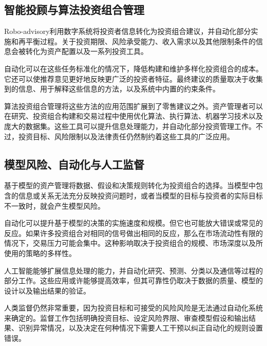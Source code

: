 \subsection{智能投顾与算法投资组合管理}

Robo-advisory利用数字系统将投资者信息转化为投资组合建议，并自动化部分实施和再平衡过程。关于投资期限、风险承受能力、收入需求以及其他限制条件的信息会被转化为资产配置以及一系列投资工具。

自动化可以在这些任务标准化的情况下，降低构建和维护多样化投资组合的成本。它还可以使推荐意见更好地反映更广泛的投资者特征。最终建议的质量取决于收集到的信息、用于解释这些信息的方法，以及系统中内置的约束条件。

算法投资组合管理将这些方法的应用范围扩展到了零售建议之外。资产管理者可以在研究、投资组合构建和交易过程中使用优化算法、执行算法、机器学习技术以及庞大的数据集。这些工具可以提升信息处理能力，并自动化部分投资管理工作。不过，投资目标、风险限制以及法律责任仍然制约着这些工具的广泛应用。

\subsection{模型风险、自动化与人工监督}

基于模型的资产管理将数据、假设和决策规则转化为投资组合的选择。当模型中包含的信息或关系无法充分反映投资问题时，或者当模型的目标与投资者的实际目标不一致时，就会产生模型风险。

自动化可以提升基于模型的决策的实施速度和规模。但它也可能放大错误或常见的反应。如果许多投资组合对相同的信号做出相同的反应，那么在市场流动性有限的情况下，交易压力可能会集中。这种影响取决于投资组合的规模、市场深度以及所使用的策略的多样性。

人工智能能够扩展信息处理的能力，并自动化研究、预测、分类以及通信等过程的部分工作。这些应用或许能够提高效率，但其可靠性仍取决于数据的质量、模型的设计以及输出结果的验证。

人类监督仍然非常重要，因为投资目标和可接受的风险风险是无法通过自动化系统来确定的。监督工作包括明确投资目标、设定风险界限、审查模型假设和输出结果、识别异常情况，以及决定在何种情况下需要人工干预以纠正自动化的规则设置错误。

